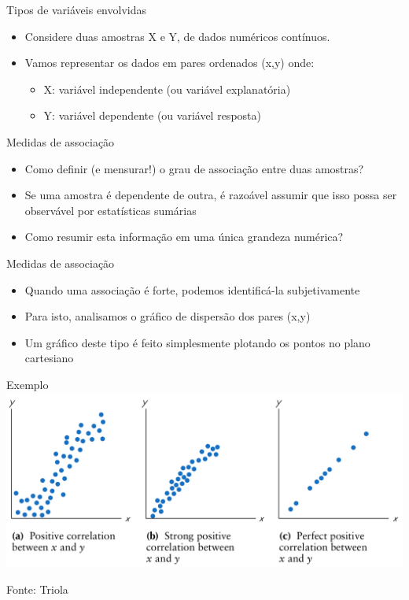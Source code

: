 \documentclass{beamer}
\begin{document}
\begin{frame}{\scriptsize Tipos de variáveis envolvidas}
  \begin{itemize}
    \footnotesize
  \item Considere duas amostras X e Y, de dados numéricos contínuos.
    \bigskip
  \item Vamos representar os dados em pares ordenados (x,y) onde:
    \begin{itemize}
      \scriptsize
    \item X: variável independente (ou variável explanatória)
    \item Y: variável dependente (ou variável resposta)
    \end{itemize}
  \end{itemize}
\end{frame}

\begin{frame}{\scriptsize Medidas de associação}
  \begin{itemize}
    \footnotesize
  \item Como definir (e mensurar!) o grau de associação entre duas amostras?
    \bigskip
  \item Se uma amostra é dependente de outra, é razoável assumir que isso
    possa ser observável por estatísticas sumárias
    \bigskip
  \item Como resumir esta informação em uma única grandeza numérica?
  \end{itemize}
\end{frame}

\begin{frame}{\scriptsize Medidas de associação}
  \begin{itemize}
    \footnotesize
  \item Quando uma associação é forte, podemos identificá-la
    subjetivamente
    \bigskip
  \item Para isto, analisamos o gráfico de dispersão dos pares (x,y)
    \bigskip
  \item Um gráfico deste tipo é feito simplesmente plotando os pontos
    no plano cartesiano
  \end{itemize}
\end{frame}

\begin{frame}{\scriptsize Exemplo}
  \includegraphics[height=0.6\textheight]{Cap17/positive}

  \vfill
  \hfill \tiny Fonte: Triola
\end{frame}
\end{document}
